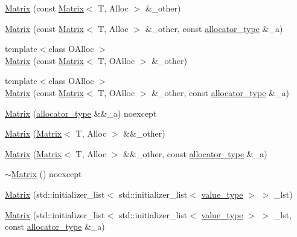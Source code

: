 \begin{Indent}
\begin{DoxyCompactItemize}
\item 
\hyperlink{classanpi_1_1Matrix_a8ac1a07fbbf670e4aba4cd24be13795d}{Matrix} (const \hyperlink{classanpi_1_1Matrix}{Matrix}$<$ T, Alloc $>$ \&\+\_\+other)
\item 
\hyperlink{classanpi_1_1Matrix_a0bda39fd27d75c2304d7bf18621c4f52}{Matrix} (const \hyperlink{classanpi_1_1Matrix}{Matrix}$<$ T, Alloc $>$ \&\+\_\+other, const \hyperlink{classanpi_1_1Matrix_a3574b7528e3ddfb2f7cdf446be8286c1}{allocator\+\_\+type} \&\+\_\+a)
\item 
{\footnotesize template$<$class O\+Alloc $>$ }\\\hyperlink{classanpi_1_1Matrix_a282bae7fdd3631ada20070984dc22464}{Matrix} (const \hyperlink{classanpi_1_1Matrix}{Matrix}$<$ T, O\+Alloc $>$ \&\+\_\+other)
\item 
{\footnotesize template$<$class O\+Alloc $>$ }\\\hyperlink{classanpi_1_1Matrix_a6448a8879a4241b92ef27e31be59f372}{Matrix} (const \hyperlink{classanpi_1_1Matrix}{Matrix}$<$ T, O\+Alloc $>$ \&\+\_\+other, const \hyperlink{classanpi_1_1Matrix_a3574b7528e3ddfb2f7cdf446be8286c1}{allocator\+\_\+type} \&\+\_\+a)
\item 
\hyperlink{classanpi_1_1Matrix_afc314d5599ca66a9c1dc07e251a451ab}{Matrix} (\hyperlink{classanpi_1_1Matrix_a3574b7528e3ddfb2f7cdf446be8286c1}{allocator\+\_\+type} \&\&\+\_\+a) noexcept
\item 
\hyperlink{classanpi_1_1Matrix_a70dbc1b133b92274770ba28090136dea}{Matrix} (\hyperlink{classanpi_1_1Matrix}{Matrix}$<$ T, Alloc $>$ \&\&\+\_\+other)
\item 
\hyperlink{classanpi_1_1Matrix_acfb5fd6cd5be0c9d1b6f1915b1ac5f64}{Matrix} (\hyperlink{classanpi_1_1Matrix}{Matrix}$<$ T, Alloc $>$ \&\&\+\_\+other, const \hyperlink{classanpi_1_1Matrix_a3574b7528e3ddfb2f7cdf446be8286c1}{allocator\+\_\+type} \&\+\_\+a)
\item 
\hyperlink{classanpi_1_1Matrix_ab27bf73e875186026c86483660292762}{$\sim$\+Matrix} () noexcept
\item 
\hyperlink{classanpi_1_1Matrix_ac48c502a4abd6530350ed6d76aea9e31}{Matrix} (std\+::initializer\+\_\+list$<$ std\+::initializer\+\_\+list$<$ \hyperlink{classanpi_1_1Matrix_ad755076524c16fc494a392b0a66065cb}{value\+\_\+type} $>$ $>$ \+\_\+lst)
\item 
\hyperlink{classanpi_1_1Matrix_ab79b0f2cfe8a42aad18f448b7796e129}{Matrix} (std\+::initializer\+\_\+list$<$ std\+::initializer\+\_\+list$<$ \hyperlink{classanpi_1_1Matrix_ad755076524c16fc494a392b0a66065cb}{value\+\_\+type} $>$ $>$ \+\_\+lst, const \hyperlink{classanpi_1_1Matrix_a3574b7528e3ddfb2f7cdf446be8286c1}{allocator\+\_\+type} \&\+\_\+a)
\end{DoxyCompactItemize}
\end{Indent}
